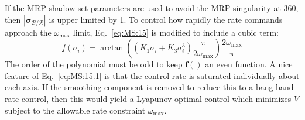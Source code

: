 \documentclass[]{BasiliskReportMemo}
\begin{document}
If the MRP shadow set parameters are used to avoid the MRP singularity at 360\dg, then $|\bm \sigma_{\mathcal{B}/\mathcal{R}}|$ is upper limited by 1.  To control how rapidly the rate commands approach the $\omega_{\text{max}}$ limit, Eq.~\eqref{eq:MS:15} is modified to include a cubic term:
\begin{equation}
	\label{eq:MS:15.1}
	 f( \sigma_{i}) = \arctan \left(
		(K_{1} \sigma_{i} +K_{3} \sigma_{i}^{3}) \frac{ \pi}{2  \omega_{\text{max}}}
	\right) \frac{2 \omega_{\text{max}}}{\pi}
\end{equation}
The order of the polynomial must be odd to keep $\bm f()$ an even function.  A nice feature of Eq.~\eqref{eq:MS:15.1} is that the control rate is saturated individually about each axis.  If the smoothing component is removed to reduce this to a bang-band rate control, then this would yield a Lyapunov optimal control which minimizes $\dot V$ subject to the allowable rate constraint $\omega_{\text{max}}$.
\end{document}
